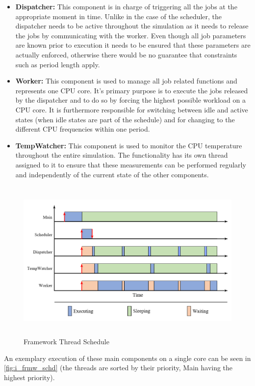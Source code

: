 \begin{itemize}
\item \textbf{Dispatcher:} This component is in charge of triggering all the jobs at the appropriate moment in time. Unlike in the case of the scheduler, the dispatcher needs to be active throughout the simulation as it needs to release the jobs by communicating with the worker. Even though all job parameters are known prior to execution it needs to be ensured that these parameters are actually enforced, otherwise there would be no guarantee that constraints such as period length apply. 
\item \textbf{Worker:} This component is used to manage all job related functions and represents one CPU core. It’s primary purpose is to execute the jobs released by the dispatcher and to do so by forcing the highest possible workload on a CPU core. It is furthermore responsible for switching between idle and active states (when idle states are part of the schedule) and for changing to the different CPU frequencies within one period.
\item \textbf{TempWatcher:} This component is used to monitor the CPU temperature throughout the entire simulation. The functionality has its own thread assigned to it to ensure that these measurements can be performed regularly and independently of the current state of the other components.
\end{itemize}
\begin{figure}[htpb]
  \centering
  \includegraphics[height=8cm]{figures/frmw_sched}
  \caption[Framework Schedule]{Framework Thread Schedule}\label{fig:i_frmw_schd}
\end{figure}
An exemplary execution of these main components on a single core can be seen in \autoref{fig:i_frmw_schd} (the threads are sorted by their priority, Main having the highest priority).
